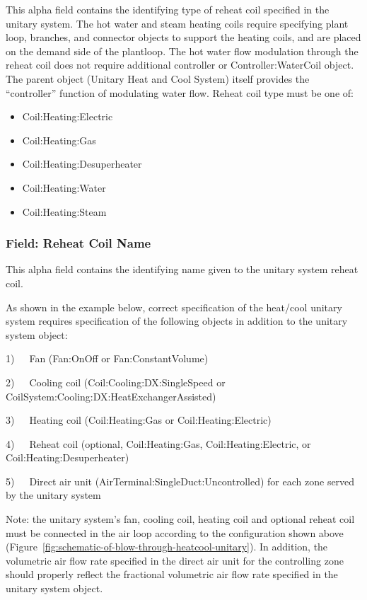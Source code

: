 This alpha field contains the identifying type of reheat coil specified in the unitary system. The hot water and steam heating coils require specifying plant loop, branches, and connector objects to support the heating coils, and are placed on the demand side of the plantloop. The hot water flow modulation through the reheat coil does not require additional controller or Controller:WaterCoil object. The parent object (Unitary Heat and Cool System) itself provides the ``controller'' function of modulating water flow. Reheat coil type must be one of:

\begin{itemize}
\item
  Coil:Heating:Electric
\item
  Coil:Heating:Gas
\item
  Coil:Heating:Desuperheater
\item
  Coil:Heating:Water
\item
  Coil:Heating:Steam
\end{itemize}

\subsubsection{Field: Reheat Coil Name}\label{field-reheat-coil-name-1-000}

This alpha field contains the identifying name given to the unitary system reheat coil.

As shown in the example below, correct specification of the heat/cool unitary system requires specification of the following objects in addition to the unitary system object:

1)~~~Fan (Fan:OnOff or Fan:ConstantVolume)

2)~~~Cooling coil (Coil:Cooling:DX:SingleSpeed or CoilSystem:Cooling:DX:HeatExchangerAssisted)

3)~~~Heating coil (Coil:Heating:Gas or Coil:Heating:Electric)

4)~~~Reheat coil (optional, Coil:Heating:Gas, Coil:Heating:Electric, or Coil:Heating:Desuperheater)

5)~~~Direct air unit (AirTerminal:SingleDuct:Uncontrolled) for each zone served by the unitary system

Note: the unitary system's fan, cooling coil, heating coil and optional reheat coil must be connected in the air loop according to the configuration shown above (Figure~\ref{fig:schematic-of-blow-through-heatcool-unitary}). In addition, the volumetric air flow rate specified in the direct air unit for the controlling zone should properly reflect the fractional volumetric air flow rate specified in the unitary system object.

